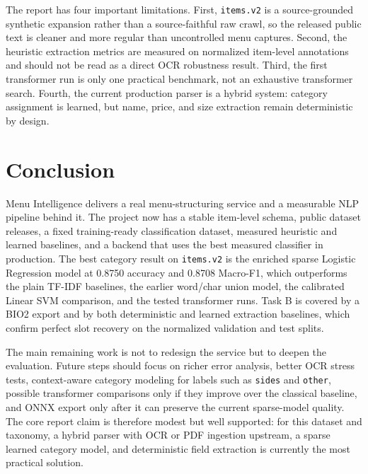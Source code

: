 \documentclass{article}
\begin{document}
The report has four important limitations. First, \texttt{items.v2} is a
source-grounded synthetic expansion rather than a source-faithful raw crawl, so
the released public text is cleaner and more regular than uncontrolled menu
captures. Second, the heuristic extraction metrics are measured on normalized
item-level annotations and should not be read as a direct OCR robustness
result. Third, the first transformer run is only one practical benchmark, not
an exhaustive transformer search. Fourth, the current production parser is a
hybrid system: category assignment is learned, but name, price, and size
extraction remain deterministic by design.

\section{Conclusion}

Menu Intelligence delivers a real menu-structuring service and a measurable NLP
pipeline behind it. The project now has a stable item-level schema, public
dataset releases, a fixed training-ready classification dataset, measured
heuristic and learned baselines, and a backend that uses the best measured
classifier in production. The best category result on
\texttt{items.v2} is the enriched sparse Logistic Regression model at 0.8750
accuracy and 0.8708 Macro-F1, which outperforms the plain TF-IDF baselines,
the earlier word/char union model, the calibrated Linear SVM comparison, and
the tested transformer runs. Task B is covered by a BIO2 export and by both
deterministic and learned extraction baselines, which confirm perfect slot
recovery on the normalized validation and test splits.

The main remaining work is not to redesign the service but to deepen the
evaluation. Future steps should focus on richer error analysis, better OCR
stress tests, context-aware category modeling for labels such as
\texttt{sides} and \texttt{other}, possible transformer comparisons
only if they improve over the classical baseline, and ONNX export only after
it can preserve the current sparse-model quality. The core report claim is
therefore modest but well supported: for this dataset and taxonomy, a hybrid
parser with OCR or PDF ingestion upstream, a sparse learned category model,
and deterministic field
extraction is currently the most practical solution.



\end{document}
